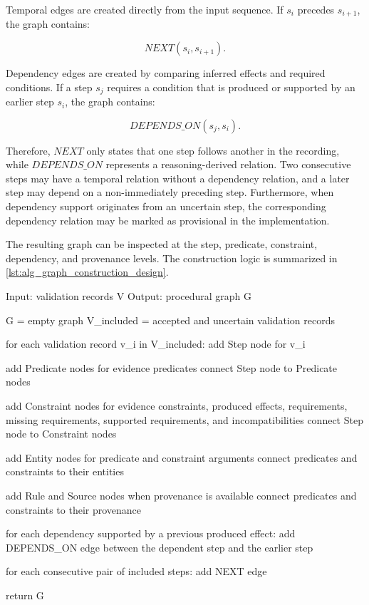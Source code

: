 Temporal edges are created directly from the input sequence. If $s_i$ precedes $s_{i+1}$, the graph contains:

\[
NEXT(s_i,s_{i+1}).
\]

Dependency edges are created by comparing inferred effects and required conditions. If a step $s_j$ requires a condition that is produced or supported by an earlier step $s_i$, the graph contains:

\[
DEPENDS\_ON(s_j,s_i).
\]

Therefore, $NEXT$ only states that one step follows another in the recording, while $DEPENDS\_ON$ represents a reasoning-derived relation. Two consecutive steps may have a temporal relation without a dependency relation, and a later step may depend on a non-immediately preceding step. Furthermore, when dependency support originates from an uncertain step, the corresponding dependency relation may be marked as provisional in the implementation.

The resulting graph can be inspected at the step, predicate, constraint, dependency, and provenance levels. The construction logic is summarized in \cref{lst:alg_graph_construction_design}.

\begin{listing*}
\begin{Code}
Input: validation records V
Output: procedural graph G

G = empty graph
V_included = accepted and uncertain validation records

for each validation record v_i in V_included:
    add Step node for v_i

    add Predicate nodes for evidence predicates
    connect Step node to Predicate nodes

    add Constraint nodes for evidence constraints,
        produced effects, requirements, missing requirements,
        supported requirements, and incompatibilities
    connect Step node to Constraint nodes

    add Entity nodes for predicate and constraint arguments
    connect predicates and constraints to their entities

    add Rule and Source nodes when provenance is available
    connect predicates and constraints to their provenance

for each dependency supported by a previous produced effect:
    add DEPENDS_ON edge between the dependent step and the earlier step

for each consecutive pair of included steps:
    add NEXT edge

return G
\end{Code}
\caption{Design-level construction of the procedural graph from validation records. Implementation-specific export properties are omitted here and described in \cref{cha:implementation}.}
\label{lst:alg_graph_construction_design}
\end{listing*}



